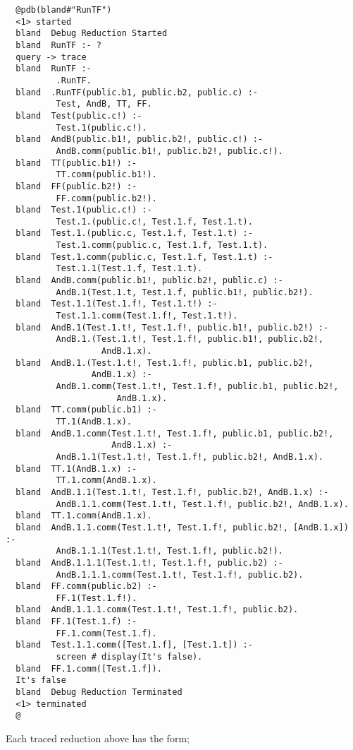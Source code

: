\begin{verbatim}
  @pdb(bland#"RunTF")
  <1> started
  bland  Debug Reduction Started
  bland  RunTF :- ?
  query -> trace
  bland  RunTF :- 
          .RunTF.
  bland  .RunTF(public.b1, public.b2, public.c) :- 
          Test, AndB, TT, FF.
  bland  Test(public.c!) :- 
          Test.1(public.c!).
  bland  AndB(public.b1!, public.b2!, public.c!) :- 
          AndB.comm(public.b1!, public.b2!, public.c!).
  bland  TT(public.b1!) :- 
          TT.comm(public.b1!).
  bland  FF(public.b2!) :- 
          FF.comm(public.b2!).
  bland  Test.1(public.c!) :- 
          Test.1.(public.c!, Test.1.f, Test.1.t).
  bland  Test.1.(public.c, Test.1.f, Test.1.t) :- 
          Test.1.comm(public.c, Test.1.f, Test.1.t).
  bland  Test.1.comm(public.c, Test.1.f, Test.1.t) :- 
          Test.1.1(Test.1.f, Test.1.t).
  bland  AndB.comm(public.b1!, public.b2!, public.c) :- 
          AndB.1(Test.1.t, Test.1.f, public.b1!, public.b2!).
  bland  Test.1.1(Test.1.f!, Test.1.t!) :- 
          Test.1.1.comm(Test.1.f!, Test.1.t!).
  bland  AndB.1(Test.1.t!, Test.1.f!, public.b1!, public.b2!) :- 
          AndB.1.(Test.1.t!, Test.1.f!, public.b1!, public.b2!,
                   AndB.1.x).
  bland  AndB.1.(Test.1.t!, Test.1.f!, public.b1, public.b2!,
                 AndB.1.x) :- 
          AndB.1.comm(Test.1.t!, Test.1.f!, public.b1, public.b2!,
                      AndB.1.x).
  bland  TT.comm(public.b1) :- 
          TT.1(AndB.1.x).
  bland  AndB.1.comm(Test.1.t!, Test.1.f!, public.b1, public.b2!,
                     AndB.1.x) :- 
          AndB.1.1(Test.1.t!, Test.1.f!, public.b2!, AndB.1.x).
  bland  TT.1(AndB.1.x) :- 
          TT.1.comm(AndB.1.x).
  bland  AndB.1.1(Test.1.t!, Test.1.f!, public.b2!, AndB.1.x) :- 
          AndB.1.1.comm(Test.1.t!, Test.1.f!, public.b2!, AndB.1.x).
  bland  TT.1.comm(AndB.1.x).
  bland  AndB.1.1.comm(Test.1.t!, Test.1.f!, public.b2!, [AndB.1.x]) :- 
          AndB.1.1.1(Test.1.t!, Test.1.f!, public.b2!).
  bland  AndB.1.1.1(Test.1.t!, Test.1.f!, public.b2) :- 
          AndB.1.1.1.comm(Test.1.t!, Test.1.f!, public.b2).
  bland  FF.comm(public.b2) :- 
          FF.1(Test.1.f!).
  bland  AndB.1.1.1.comm(Test.1.t!, Test.1.f!, public.b2).
  bland  FF.1(Test.1.f) :- 
          FF.1.comm(Test.1.f).
  bland  Test.1.1.comm([Test.1.f], [Test.1.t]) :- 
          screen # display(It's false).
  bland  FF.1.comm([Test.1.f]).
  It's false
  bland  Debug Reduction Terminated
  <1> terminated
  @
\end{verbatim}

\noindent
Each traced reduction above has the form;

